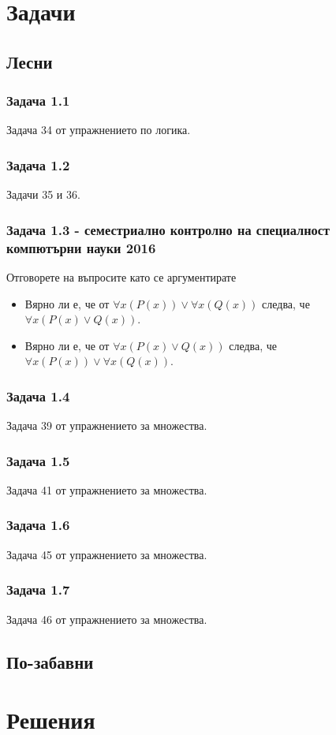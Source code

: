 \documentclass[12pt]{article}
\begin{document}
\section*{Задачи}

\subsection*{Лесни}
\subsubsection*{Задача 1.1}
Задача 34 от упражнението по логика.
\subsubsection*{Задача 1.2}
Задачи 35 и 36.
\subsubsection*{Задача 1.3 - семестриално контролно на специалност компютърни науки 2016}
Отговорете на въпросите като се аргументирате
\begin{itemize}
    \item Вярно ли е, че от $\forall x (P(x)) \lor \forall x(Q(x))$ следва, че $\forall x (P(x) \lor Q(x))$.
    \item Вярно ли е, че от $\forall x (P(x) \lor Q(x))$ следва, че $\forall x (P(x)) \lor \forall x(Q(x))$.
\end{itemize}
\subsubsection*{Задача 1.4}
Задача 39 от упражнението за множества.
\subsubsection*{Задача 1.5}
Задача 41 от упражнението за множества.
\subsubsection*{Задача 1.6}
Задача 45 от упражнението за множества.
\subsubsection*{Задача 1.7}
Задача 46 от упражнението за множества.

\subsection*{По-забавни}

\section*{Решения}
\end{document}

